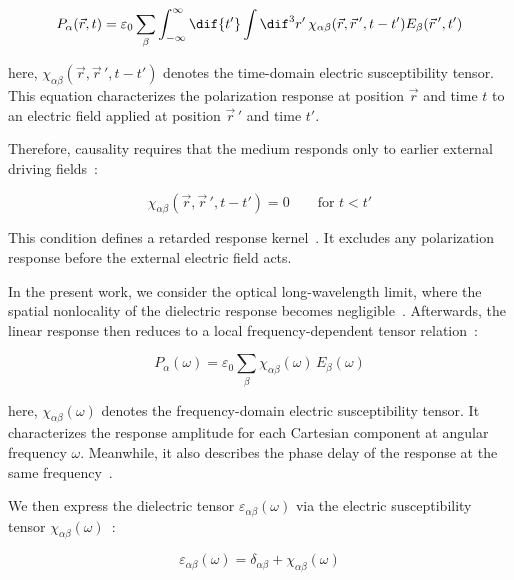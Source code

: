 \begin{equation}
    P_{\alpha}(\vec{r},t) = 
    \varepsilon_0\sum_{\beta}\int_{-\infty}^{\infty}\dif{t'}
    \int\dif^3{r'}\,\chi_{\alpha\beta}(\vec{r},\vec{r}\,',t-t')
    E_{\beta}(\vec{r}\,',t')
\label{general_linear_response_polarization}
\end{equation}

here, $\chi_{\alpha\beta}(\vec{r},\vec{r}\,',t-t')$ denotes the time-domain electric susceptibility tensor.
This equation characterizes the polarization response at position $\vec{r}$ and time $t$ to an electric field applied at position $\vec{r}\,'$ and time $t'$.

Therefore, causality requires that the medium responds only to earlier external driving fields~\cite{stefanski2022analytical}:

\begin{equation}
    \chi_{\alpha\beta}(\vec{r},\vec{r}\,',t-t')=0
    \qquad \text{for $t<t'$}
\label{causal_condition_susceptibility_kernel}
\end{equation}

This condition defines a retarded response kernel~\cite{landau2013electrodynamics}.
It excludes any polarization response before the external electric field acts.

In the present work,
we consider the optical long-wavelength limit,
where the spatial nonlocality of the dielectric response becomes negligible~\cite{agranovich2013crystal}.
Afterwards, the linear response then reduces to a local frequency-dependent tensor relation~\cite{franta2023dispersion}:

\begin{equation}
    P_{\alpha}(\omega) =
    \varepsilon_0\sum_{\beta}\chi_{\alpha\beta}(\omega)
    \,E_{\beta}(\omega)
\label{frequency_domain_polarization_response}
\end{equation}

here, $\chi_{\alpha\beta}(\omega)$ denotes the frequency-domain electric susceptibility tensor.
It characterizes the response amplitude for each Cartesian component at angular frequency $\omega$.
Meanwhile, it also describes the phase delay of the response at the same frequency~\cite{koutserimpas2024time}.

We then express the dielectric tensor $\varepsilon_{\alpha\beta}(\omega)$ via the electric susceptibility tensor $\chi_{\alpha\beta}(\omega)$~\cite{franta2020symmetry}:

\begin{equation}
    \varepsilon_{\alpha\beta}(\omega) =
    \delta_{\alpha\beta}
    + \chi_{\alpha\beta}(\omega)
\label{dielectric_tensor_from_susceptibility}
\end{equation}

